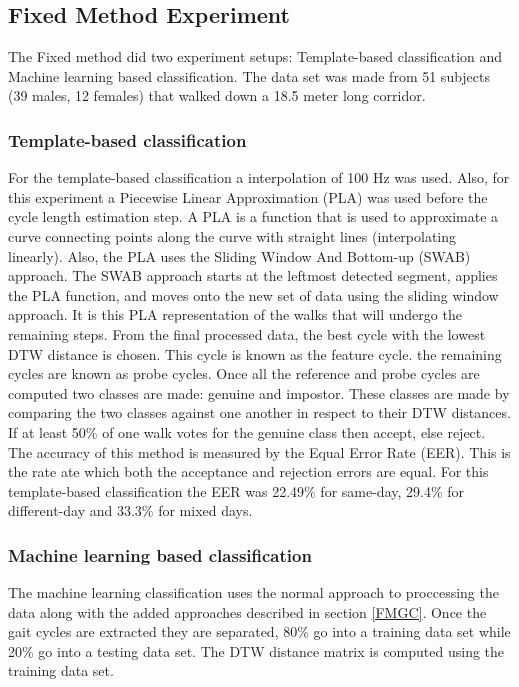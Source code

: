 \documentclass{sig-alternate}
\begin{document}
\subsection{Fixed Method Experiment}
	The Fixed method did two experiment setups: Template-based classification and Machine learning based classification. The data set was made from 51 subjects (39 males, 12 females) that walked down a 18.5 meter long corridor.
\subsubsection{Template-based classification}
	 For the template-based classification a interpolation of 100 Hz was used. Also, for this experiment a Piecewise Linear Approximation (PLA) was used before the cycle length estimation step. A PLA is a function that is used to approximate a curve connecting points along the curve with straight lines (interpolating linearly). Also, the PLA uses the Sliding Window And Bottom-up (SWAB) approach.  The SWAB approach starts at the leftmost detected segment, applies the PLA function, and moves onto the new set of data using the sliding window approach. It is this PLA representation of the walks that will undergo the remaining steps. From the final processed data, the best cycle with the lowest DTW distance is chosen. This cycle is known as the feature cycle. the remaining cycles are known as probe cycles. Once all the reference and probe cycles are computed two classes are made: genuine and impostor. These classes are made by comparing the two classes against one another in respect to their DTW distances. If at least 50\% of one walk votes for the genuine class then accept, else reject. The accuracy of this method is measured by the Equal Error Rate (EER). This is the rate ate which both the acceptance and rejection errors are equal. For this template-based classification the EER was 22.49\% for same-day, 29.4\% for different-day and 33.3\% for mixed days. 
\subsubsection{Machine learning based classification}
The machine learning classification uses the normal approach to proccessing the data along with the added approaches described in section \ref{FMGC}. Once the gait cycles are extracted they are separated, 80\% go into a training data set while 20\% go into a testing data set. The DTW distance matrix is computed using the training data set. 
\end{document}
